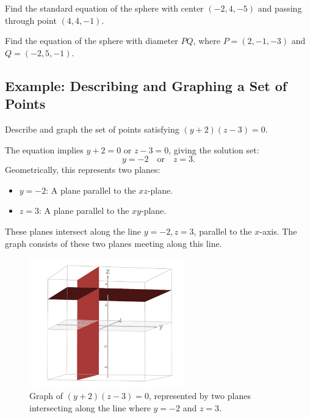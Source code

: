 \documentclass{article}
\begin{document}
\begin{exercisebox}
    Find the standard equation of the sphere with center \((-2, 4, -5)\) and passing through point \((4, 4, -1)\).
\end{exercisebox}

\begin{exercisebox}
    Find the equation of the sphere with diameter \(PQ\), where \(P = (2, -1, -3)\) and \(Q = (-2, 5, -1)\).
\end{exercisebox}

\subsection*{Example: Describing and Graphing a Set of Points}

\begin{examplebox}
    Describe and graph the set of points satisfying \((y + 2)(z - 3) = 0\).

    \begin{solutionbox}
        The equation implies \( y + 2 = 0 \) or \( z - 3 = 0 \), giving the solution set:
        \[
        y = -2 \quad \text{or} \quad z = 3.
        \]
        Geometrically, this represents two planes:
        \begin{itemize}
            \item \( y = -2 \): A plane parallel to the \( xz \)-plane.
            \item \( z = 3 \): A plane parallel to the \( xy \)-plane.
        \end{itemize}
        These planes intersect along the line \( y = -2, z = 3 \), parallel to the \( x \)-axis. The graph consists of these two planes meeting along this line.

        \begin{figure}[H]
            \centering
            \includegraphics[width=0.6\textwidth]{(y+2)(z-3)=0.png}
            \caption{Graph of \( (y + 2)(z - 3) = 0 \), represented by two planes intersecting along the line where \(y = -2\) and \(z = 3\).}
            \label{fig:two_planes}
        \end{figure}
    \end{solutionbox}
\end{examplebox}
\end{document}
